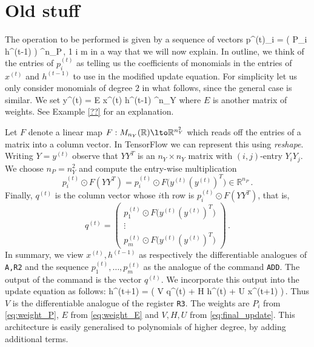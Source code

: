 
\section{Old stuff}

The operation to be performed is given by a sequence of vectors
\be\label{eq:weight_P}
p^{(t)}_i = \sigma( P_i h^{(t-1)} ) \in {}^{n_P}\,, 1 \le i \le m
\ee
in a way that we will now explain. In outline, we think of the entries of $p^{(t)}_i$ as telling us the coefficients of monomials in the entries of $x^{(t)}$ and $h^{(t-1)}$ to use in the modified update equation. For simplicity let us only consider monomials of degree $2$ in what follows, since the general case is similar. We set
\be\label{eq:weight_E}
y^{(t)} = E x^{(t)} \oplus h^{(t-1)} \in {}^{n_Y}
\ee
where $E$ is another matrix of weights. See Example \ref{??} for an explanation.

Let $F$ denote a linear map $F: M_{n_Y}(\mathbb{R}) \lto \mathbb{R}^{n_Y^2}$ which reads off the entries of a matrix into a column vector. In TensorFlow we can represent this using \emph{reshape}. Writing $Y = y^{(t)}$ observe that $Y Y^T$ is an $n_Y \times n_Y$ matrix with $(i,j)$-entry $Y_i Y_j$. We choose $n_P = n_Y^2$ and compute the entry-wise multiplication
\[
p^{(t)}_i \odot F(Y Y^T) = p^{(t)}_i \odot F\big( y^{(t)} ( y^{(t)} )^T \big) \in \mathbb{R}^{n_P}\,.
\]
Finally, $q^{(t)}$ is the column vector whose $i$th row is $p^{(t)}_i \odot F(Y Y^T)$, that is,
\[
q^{(t)} = \begin{pmatrix} p^{(t)}_1 \odot F\big( y^{(t)} ( y^{(t)} )^T \big) \\
\vdots\\
p^{(t)}_m \odot F\big( y^{(t)} ( y^{(t)} )^T \big) \end{pmatrix}\,.
\] 
In summary, we view $x^{(t)}, h^{(t-1)}$ as respectively the differentiable analogues of \verb+A,R2+ and the sequence $p^{(t)}_1, \ldots, p^{(t)}_m$ as the analogue of the command \verb+ADD+. The output of the command is the vector $q^{(t)}$. We incorporate this output into the update equation as follows:
\be\label{eq:final_update}
h^{(t+1)} = \sigma\big( V q^{(t)} + H h^{(t)} + U x^{(t+1)} \big)\,.
\ee
Thus $V$ is the differentiable analogue of the register \verb+R3+. The weights are $P_i$ from \eqref{eq:weight_P}, $E$ from \eqref{eq:weight_E} and $V, H, U$ from \eqref{eq:final_update}. This architecture is easily generalised to polynomials of higher degree, by adding additional terms.

